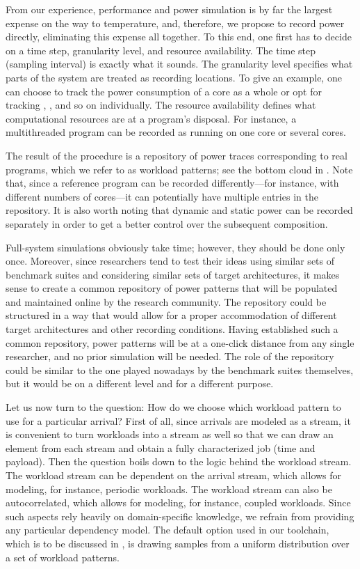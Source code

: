 From our experience, performance and power simulation is by far the largest
expense on the way to temperature, and, therefore, we propose to record power
directly, eliminating this expense all together. To this end, one first has to
decide on a time step, granularity level, and resource availability. The time
step (sampling interval) is exactly what it sounds. The granularity level
specifies what parts of the system are treated as recording locations. To give
an example, one can choose to track the power consumption of a core as a whole
or opt for tracking , , and so on individually. The resource
availability defines what computational resources are at a program's disposal.
For instance, a multithreaded program can be recorded as running on one core or
several cores.

The result of the procedure is a repository of power traces corresponding to
real programs, which we refer to as workload patterns; see the bottom cloud in
. Note that, since a reference program can be recorded
differently---for instance, with different numbers of cores---it can potentially
have multiple entries in the repository. It is also worth noting that dynamic
and static power can be recorded separately in order to get a better control
over the subsequent composition.

Full-system simulations obviously take time; however, they should be done only
once. Moreover, since researchers tend to test their ideas using similar sets of
benchmark suites and considering similar sets of target architectures, it makes
sense to create a common repository of power patterns that will be populated and
maintained online by the research community. The repository could be structured
in a way that would allow for a proper accommodation of different target
architectures and other recording conditions. Having established such a common
repository, power patterns will be at a one-click distance from any single
researcher, and no prior simulation will be needed. The role of the repository
could be similar to the one played nowadays by the benchmark suites themselves,
but it would be on a different level and for a different purpose.

Let us now turn to the question: How do we choose which workload pattern to use
for a particular arrival? First of all, since arrivals are modeled as a stream,
it is convenient to turn workloads into a stream as well so that we can draw an
element from each stream and obtain a fully characterized job (time and
payload). Then the question boils down to the logic behind the workload stream.
The workload stream can be dependent on the arrival stream, which allows for
modeling, for instance, periodic workloads. The workload stream can also be
autocorrelated, which allows for modeling, for instance, coupled workloads.
Since such aspects rely heavily on domain-specific knowledge, we refrain from
providing any particular dependency model. The default option used in our
toolchain, which is to be discussed in , is drawing samples from
a uniform distribution over a set of workload patterns.

